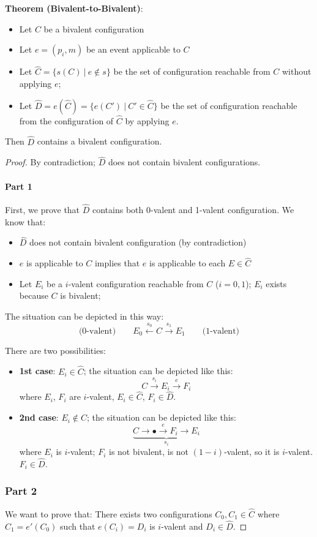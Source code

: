 \documentclass[12pt]{article}
\newcommand{\BI}{\begin{itemize}}
\newcommand{\EI}{\end{itemize}}
\newenvironment{lemma}[1]{\textbf{Theorem (#1)}: }{\medskip}
\begin{document}
\begin{lemma}{Bivalent-to-Bivalent}~
\BI
\item Let $C$ be a bivalent configuration
\item Let $e=(p_i,m)$ be an event applicable to $C$
\item Let $\hat{C} = \{ s(C) ~|~ e \not\in s \}$ be the set of configuration reachable from $C$ without applying $e$;
\item Let $\hat{D} = e(\hat{C}) = \{ e(C') ~|~ C' \in \hat{C} \}$ be the set of configuration reachable from the configuration
  of $\hat{C}$ by applying $e$.
\EI
Then $\hat{D}$ contains a bivalent configuration.
\end{lemma}

\begin{proof}
By contradiction; $\hat{D}$ does not contain bivalent configurations.

\paragraph{Part 1}
First, we prove that $\hat{D}$ contains both 0-valent and 1-valent configuration. We know that:
\BI
\item $\hat{D}$ does not contain bivalent configuration (by contradiction)
\item $e$ is applicable to $C$ implies that $e$ is applicable to each $E \in \hat{C}$
\item Let $E_i$ be a $i$-valent configuration reachable from $C$ ($i=0,1$); $E_i$ exists
  because $C$ is bivalent;
\EI
The situation can be depicted in this way:
\[
  \text{(0-valent)} \qquad E_0 \xleftarrow{s_0} C \xrightarrow{s_1} E_1 \qquad \text{(1-valent)}
\]

There are two possibilities:
\BI
\item {\bf 1st case}:  
$E_i \in \hat{C}$; the situation can be depicted like this:
\[
  C \xrightarrow{s_i} E_i \xrightarrow{e} F_i
\]
where $E_i$, $F_i$ are $i$-valent, $E_i \in \hat{C}$, $F_i \in \hat{D}$.

\item {\bf 2nd case}:
$E_i \not\in \hat{C}$; the situation can be depicted like this:
\[
  \underbrace{ C \rightarrow \bullet \xrightarrow{e} F_i \rightarrow E_i}_{s_i}
\]
where $E_i$ is $i$-valent; $F_i$ is not bivalent, is not $(1-i)$-valent, so it is
$i$-valent. $F_i \in \hat{D}$.
\EI 

\newpage

\subsubsection*{Part 2}
We want to prove that:
  There exists two configurations $C_0, C_1 \in \hat{C}$ where $C_1=e'(C_0)$ such that
  $e(C_i)=D_i$ is $i$-valent and $D_i \in \hat{D}$.


\end{proof}
\end{document}
